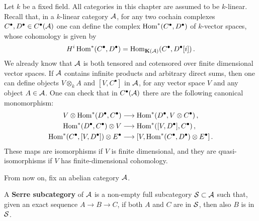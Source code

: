 

Let $k$ be a fixed field. All categories in this chapter are assumed to be $k$-linear.
Recall that, in a $k$-linear category $\mathcal{A}$,
for any two cochain complexes $C^{\bullet}, D^{\bullet} \in C^{\bullet}(\mathcal{A})$
one can define the complex $\operatorname{Hom}^*(C^{\bullet}, D^{\bullet})$
of $k$-vector spaces, whose cohomology is given by
\begin{equation*}
	H^{i} \operatorname{Hom}^*(C^{\bullet}, D^{\bullet})
	= \operatorname{Hom}_{{\normalfont\textbf{K}}(\mathcal{A})}(C^{\bullet},D^{\bullet}[i])\,.
\end{equation*}
We already know that $\mathcal{A}$ is both tensored and cotensored over finite dimensional vector spaces.
If $\mathcal{A}$ contains infinite products and arbitrary direct sums,
then one can define objects $V \otimes_{k} A$ and $[V,C^{\bullet}]$ in $\mathcal{A}$,
for any vector space $V$ and any object $A \in \mathcal{A}$.
One can check that in $C^{\bullet}(\mathcal{A})$ there are the following canonical monomorphism:
\begin{align}\label{tensor-adjs}
	V \otimes \operatorname{Hom}^*(D^{\bullet}, C^{\bullet}) 
	&\longrightarrow \operatorname{Hom}^{*}(D^{\bullet}, V \otimes C^{\bullet})\,, \\
	\operatorname{Hom}^{*}(D^{\bullet},C^{\bullet}) \otimes V 
	&\longrightarrow \operatorname{Hom}^{*}([V,D^{\bullet}],C^{\bullet})\,, \\
	\operatorname{Hom}^{*}(C^{\bullet},[V,D^{\bullet}]) \otimes E^{\bullet}
	&\longrightarrow [V, \operatorname{Hom}^{*}(C^{\bullet},D^{\bullet}) \otimes E^{\bullet}]\,.
\end{align}
These maps are isomorphisms if $V$ is finite dimensional,
and they are quasi-isomorphisms if $V$ has finite-dimensional cohomology.

From now on, fix an abelian category $\mathcal{A}$.

\begin{df}
	A \textbf{Serre subcategory} of $\mathcal{A}$ is a non-empty full subcategory $\mathcal{S} \subset \mathcal{A}$
	such that, given an exact sequence $A \to B \to C$, if both $A$ and $C$ are in $\mathcal{S}$,
	then also $B$ is in $\mathcal{S}$.
\end{df}

